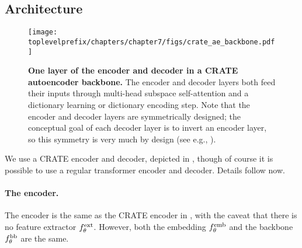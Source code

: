\documentclass[\toplevelprefix/book-main.tex]{subfiles}
\begin{document}
\subsection{Architecture}\label{sub:image_completion_architecture}

\begin{figure}
    \centering 
    \texttt{[image: \\toplevelprefix/chapters/chapter7/figs/crate\_ae\_backbone.pdf]}
    \caption{\small\textbf{One layer of the encoder and decoder in a CRATE autoencoder backbone.} The encoder and decoder layers both feed their inputs through multi-head subspace self-attention and a dictionary learning or dictionary encoding step. Note that the encoder and decoder layers are symmetrically designed; the conceptual goal of each decoder layer is to invert an encoder layer, so this symmetry is very much by design (see e.g., ).}
\end{figure}

We use a CRATE encoder and decoder, depicted in , though of course it is possible to use a regular transformer encoder and decoder. Details follow now.

\paragraph{The encoder.} The encoder is the same as the CRATE encoder in , with the caveat that there is no feature extractor \(f_{\theta}^{\mathrm{ext}}\). However, both the embedding \(f_{\theta}^{\mathrm{emb}}\) and the backbone \(f_{\theta}^{\mathrm{bb}}\) are the same.
\end{document}
